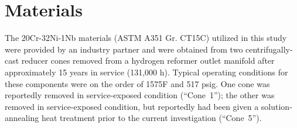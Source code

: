 \chapter{Materials}\label{ch:materials}
The 20Cr-32Ni-1Nb materials (ASTM A351 Gr. CT15C) utilized in this study were provided by an industry partner and were obtained from two centrifugally-cast reducer cones removed from a hydrogen reformer outlet manifold after approximately 15 years in service (131,000 h). Typical operating conditions for these components were on the order of 1575\textdegree{}F and 517 psig.  One cone was reportedly removed in service-exposed condition (``Cone~1''); the other was removed in service-exposed condition, but reportedly had been given a solution-annealing heat treatment prior to the current investigation (``Cone~5'').

